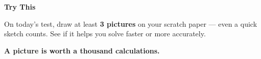 {\vspace{3mm}

\begin{tcolorbox}[
    enhanced,
    colback=funYellowLight,
    colframe=funYellow!60,
    arc=10pt,
    boxrule=1pt,
    left=6mm, right=6mm, top=4mm, bottom=4mm,
]
{\bfseries\color{funYellowDark} \faLightbulb\hspace{2mm}Try This}

\vspace{2mm}

On today's test, draw at least \textbf{3 pictures} on your scratch paper — even a quick sketch counts. See if it helps you solve faster or more accurately.
\end{tcolorbox}

\vspace{4mm}

\begin{center}
{\large\bfseries\color{funPinkDark} \faPaintBrush\hspace{2mm}A picture is worth a thousand calculations.\hspace{2mm}\faPaintBrush}
\end{center}

}
\newpage
